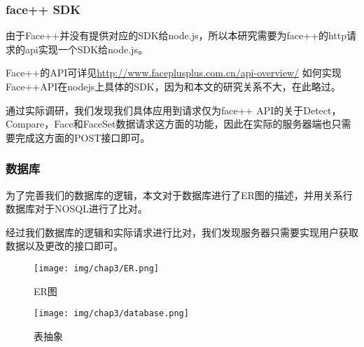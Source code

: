 \subsubsection{face++ SDK}
由于Face++并没有提供对应的SDK给node.js，所以本研究需要为face++的http请求的api实现一个SDK给node.js。

Face++的API可详见\url{http://www.faceplusplus.com.cn/api-overview/}
如何实现Face++API在nodejs上具体的SDK，因为和本文的研究关系不大，在此略过。

通过实际调研，我们发现我们具体应用到请求仅为face++ API的关于Detect，Compare，Face和FaceSet数据请求这方面的功能，因此在实际的服务器端也只需要完成这方面的POST接口即可。


\subsubsection{数据库}
为了完善我们的数据库的逻辑，本文对于数据库进行了ER图的描述，并用关系行数据库对于NOSQL进行了比对。

经过我们数据库的逻辑和实际请求进行比对，我们发现服务器只需要实现用户获取数据以及更改的接口即可。
\begin{figure}[h]
\centering
\texttt{[image: img/chap3/ER.png]}
\caption{ER图\label{Face++API}}
\end{figure}


\begin{figure}[h]
\centering
\texttt{[image: img/chap3/database.png]}
\caption{表抽象\label{Face++API}}
\end{figure}






